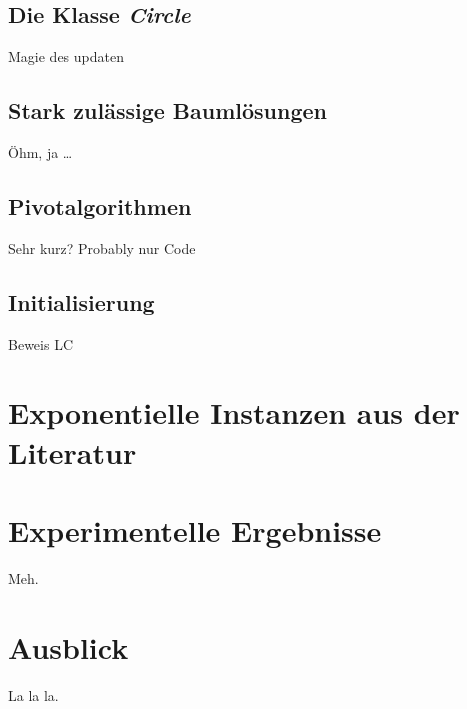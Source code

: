 \documentclass[a4paper,twoside,ngerman]{report}
\theoremstyle{plain}
\theoremstyle{definition}
\begin{document}
\section{Die Klasse \emph{Circle}}
Magie des updaten

\section{Stark zulässige Baumlösungen}
Öhm, ja \ldots

\section{Pivotalgorithmen}
Sehr kurz? Probably nur Code

\section{Initialisierung}\label{HCLC}
Beweis LC

\newpage
\chapter{Exponentielle Instanzen aus der Literatur}\label{ch:lit}

\newpage
\chapter{Experimentelle Ergebnisse}\label{ch:erg}
Meh.

\newpage
\chapter{Ausblick}
La la la.

{}

\end{document}
